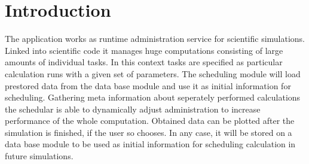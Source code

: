 \section{Introduction}






The application works as runtime administration service for scientific simulations. Linked into scientific code it manages huge computations consisting of large amounts of individual tasks. In this context tasks are specified as particular calculation runs with a given set of parameters. The scheduling module will load prestored data from the data base module and use it as initial information for scheduling. Gathering meta information about seperately performed calculations the schedular is able to dynamically adjust administration to increase performance of the whole computation. Obtained data can be plotted after the simulation is finished, if the user so chooses. In any case, it will be stored on a data base module to be used as initial information for scheduling calculation in future simulations.


